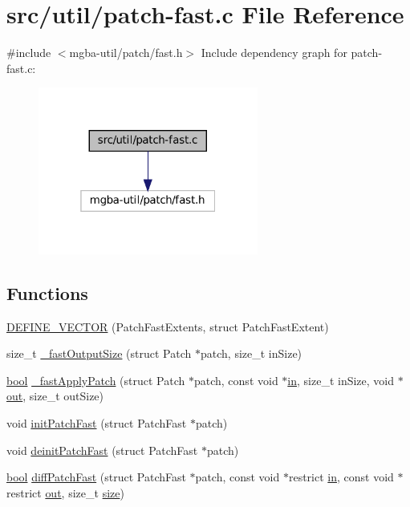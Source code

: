 \hypertarget{patch-fast_8c}{}\section{src/util/patch-\/fast.c File Reference}
\label{patch-fast_8c}
{\ttfamily \#include $<$mgba-\/util/patch/fast.\+h$>$}\newline
Include dependency graph for patch-\/fast.c\+:
\nopagebreak
\begin{figure}[H]
\begin{center}
\leavevmode
\includegraphics[width=205pt]{patch-fast_8c__incl}
\end{center}
\end{figure}
\subsection*{Functions}
\begin{DoxyCompactItemize}
\item 
\mbox{\hyperlink{patch-fast_8c_a3b7b97068b1dc4bcadd2440bcdc94896}{D\+E\+F\+I\+N\+E\+\_\+\+V\+E\+C\+T\+OR}} (Patch\+Fast\+Extents, struct Patch\+Fast\+Extent)
\item 
size\+\_\+t \mbox{\hyperlink{patch-fast_8c_a52ac89ce08d7d452245d71aa0d305d6e}{\+\_\+fast\+Output\+Size}} (struct Patch $\ast$patch, size\+\_\+t in\+Size)
\item 
\mbox{\hyperlink{libretro_8h_a4a26dcae73fb7e1528214a068aca317e}{bool}} \mbox{\hyperlink{patch-fast_8c_ab67102e77abbaa460f97daeef660dc16}{\+\_\+fast\+Apply\+Patch}} (struct Patch $\ast$patch, const void $\ast$\mbox{\hyperlink{gun_8c_a8bab68b4d22f69428207fabb60dc4f5c}{in}}, size\+\_\+t in\+Size, void $\ast$\mbox{\hyperlink{gun_8c_acb2d4658684492100bc328998f52ae82}{out}}, size\+\_\+t out\+Size)
\item 
void \mbox{\hyperlink{patch-fast_8c_af3dd4e6e3ab43135351cc1cd3e9bff90}{init\+Patch\+Fast}} (struct Patch\+Fast $\ast$patch)
\item 
void \mbox{\hyperlink{patch-fast_8c_ad79a733de65415ee6177fe21ce66234d}{deinit\+Patch\+Fast}} (struct Patch\+Fast $\ast$patch)
\item 
\mbox{\hyperlink{libretro_8h_a4a26dcae73fb7e1528214a068aca317e}{bool}} \mbox{\hyperlink{patch-fast_8c_a8cb66d058df5b15ef53ab862be14f59d}{diff\+Patch\+Fast}} (struct Patch\+Fast $\ast$patch, const void $\ast$restrict \mbox{\hyperlink{gun_8c_a8bab68b4d22f69428207fabb60dc4f5c}{in}}, const void $\ast$restrict \mbox{\hyperlink{gun_8c_acb2d4658684492100bc328998f52ae82}{out}}, size\+\_\+t \mbox{\hyperlink{ioapi_8h_a014d89bd76f74ef3a29c8f04b473eb76}{size}})
\end{DoxyCompactItemize}



